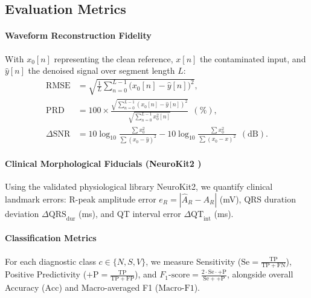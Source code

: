 \subsection{Evaluation Metrics}
\paragraph*{Waveform Reconstruction Fidelity}
With $x_0[n]$ representing the clean reference, $x[n]$ the contaminated input, and $\hat{y}[n]$ the denoised signal over segment length $L$:
\begin{align}
\mathrm{RMSE} &= \sqrt{\frac{1}{L} \sum_{n=0}^{L-1} \big(x_0[n] - \hat{y}[n]\big)^2}, \\
\mathrm{PRD}  &= 100 \times \frac{\sqrt{\sum_{n=0}^{L-1} (x_0[n] - \hat{y}[n])^2}}{\sqrt{\sum_{n=0}^{L-1} x_0^2[n]}}\ \ (\%), \\
\Delta\mathrm{SNR} &= 10\log_{10}\frac{\sum x_0^2}{\sum (x_0 - \hat{y})^2} - 10\log_{10}\frac{\sum x_0^2}{\sum (x_0 - x)^2}\ \ (\mathrm{dB}).
\end{align}

\paragraph*{Clinical Morphological Fiducials (NeuroKit2 \cite{makowski2021})}
Using the validated physiological library NeuroKit2, we quantify clinical landmark errors: R-peak amplitude error $e_R = |\hat{A}_R - A_R|$ (mV), QRS duration deviation $\Delta\mathrm{QRS}_{\mathrm{dur}}$ (ms), and QT interval error $\Delta\mathrm{QT}_{\mathrm{int}}$ (ms).

\paragraph*{Classification Metrics}
For each diagnostic class $c \in \{N, S, V\}$, we measure Sensitivity ($\mathrm{Se} = \frac{\mathrm{TP}}{\mathrm{TP} + \mathrm{FN}}$), Positive Predictivity ($+\mathrm{P} = \frac{\mathrm{TP}}{\mathrm{TP} + \mathrm{FP}}$), and $F_1\text{-score} = \frac{2 \cdot \mathrm{Se} \cdot {+\mathrm{P}}}{\mathrm{Se} + {+\mathrm{P}}}$, alongside overall Accuracy ($\mathrm{Acc}$) and Macro-averaged F1 ($\mathrm{Macro\text{-}F1}$).
